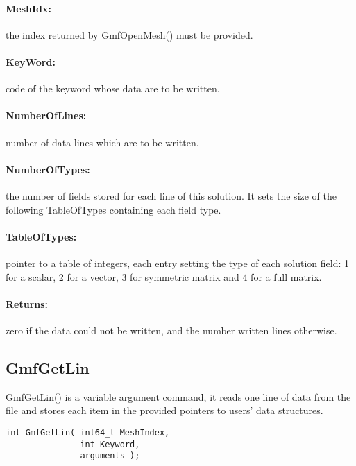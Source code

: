 \documentclass[a4paper,12pt]{article}
\begin{document}
\paragraph{MeshIdx:}
the index returned by GmfOpenMesh() must be provided.

\paragraph{KeyWord:} code of the keyword whose data are to be written.

\paragraph{NumberOfLines:} number of data lines which are to be written.

\paragraph{NumberOfTypes:} the number of fields stored for each line of this solution. It sets the size of the following TableOfTypes containing each field type.

\paragraph{TableOfTypes:} pointer to a table of integers, each entry setting the type of each solution field: 1 for a scalar, 2 for a vector, 3 for symmetric matrix and 4 for a full matrix.

\paragraph{Returns:} zero if the data could not be written, and the number written lines otherwise.


\subsection{GmfGetLin}
GmfGetLin() is a variable argument command, it reads one line of data from the file and stores each item in the provided pointers to users' data structures.

\begin{tt}
\begin{verbatim}
int GmfGetLin( int64_t MeshIndex,
               int Keyword,
               arguments );
\end{verbatim}
\end{tt}
\normalfont
\end{document}

